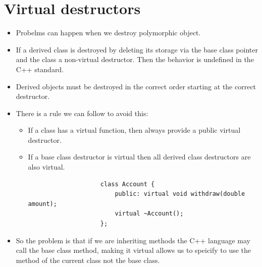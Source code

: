 \section{Virtual destructors}
\begin{itemize}
    \item Probelms can happen when we destroy polymorphic object.
    \item If a derived class is destroyed by deleting its storage via the base class pointer and the class a non-virtual destructor. Then the behavior is undefined in the C++ standard.
    \item Derived objects must be destroyed in the correct order starting at the correct destructor.
    \item There is a rule we can follow to avoid this:
        \begin{itemize}
            \item If a class has a virtual function, then always provide a public virtual destructor. 
            \item If a base class destructor is virtual then all derived class destructors are also virtual.
                \begin{verbatim}
                    class Account {
                        public: virtual void withdraw(double amount);
                        virtual ~Account();
                    };
                \end{verbatim}
        \end{itemize}
    
    \item So the problem is that if we are inheriting methods the C++ language may call the base class method, making it virtual allows us to speicify to use the method of the current class not the base class.
\end{itemize}

